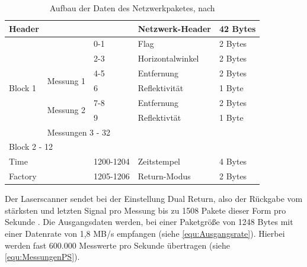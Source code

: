 \documentclass[a4paper,12pt,bibliography=totoc, listof=totoc,titlepage,pointlessnumbers]{scrreprt}
\begin{document}
\begin{table}[!ht]
\centering
\begin{tabular}{|lll|l|l|}
\hline
Header                                         &                                 
                &           & Netzwerk-Header  & 42 Bytes \\ \hline
\multicolumn{1}{|l|}{\multirow{7}{*}{Block 1}} &                                 
                & 0-1       & Flag             & 2 Bytes  \\ \cline{2-5} 
\multicolumn{1}{|l|}{}                         &                                 
                & 2-3       & Horizontalwinkel & 2 Bytes  \\ \cline{2-5} 
\multicolumn{1}{|l|}{}                         & 
\multicolumn{1}{l|}{\multirow{2}{*}{Messung 1}} & 4-5       & Entfernung       & 
2 Bytes  \\ \cline{3-5} 
\multicolumn{1}{|l|}{}                         & \multicolumn{1}{l|}{}           
                & 6         & Reflektivität    & 1 Byte   \\ \cline{2-5} 
\multicolumn{1}{|l|}{}                         & 
\multicolumn{1}{l|}{\multirow{2}{*}{Messung 2}} & 7-8       & Entfernung       & 
2 Bytes  \\ \cline{3-5} 
\multicolumn{1}{|l|}{}                         & \multicolumn{1}{l|}{}           
                & 9         & Reflektivtät     & 1 Byte   \\ \cline{2-5} 
\multicolumn{1}{|l|}{}                         & \multicolumn{4}{l|}{Messungen 3 
- 32}                                                     \\ \hline
\multicolumn{5}{|l|}{Block 2 - 12}                                               
                                                          \\ \hline
Time                                           & \multicolumn{1}{l|}{}           
                & 1200-1204 & Zeitstempel      & 4 Bytes  \\ \hline
Factory                                        & \multicolumn{1}{l|}{}           
                & 1205-1206 & Return-Modus     & 2 Bytes  \\ \hline
\end{tabular}

\caption{Aufbau der Daten des Netzwerkpaketes, nach \citet{vlpManual}}
\label{tab:datenmodell}
\end{table}

Der Laserscanner sendet bei der Einstellung Dual Return, also der Rückgabe vom stärksten und letzten Signal pro Messung 
bis zu 1508 Pakete dieser Form pro Sekunde \citep[S. 49]{vlpManual}. Die Ausgangsdaten werden, bei einer Paketgröße von 1248 Bytes mit einer Datenrate von 1,8 MB/s empfangen (siehe \autoref{equ:Ausgangsrate}). Hierbei werden fast 600.000 Messwerte pro Sekunde übertragen (siehe \autoref{equ:MessungenPS}).
\end{document}
